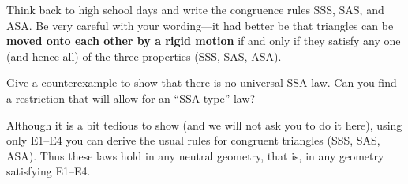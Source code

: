 \begin{exploration}
Think back to high school days and write the congruence rules SSS,
SAS, and ASA. Be very careful with your wording---it had better be
that triangles can be \textbf{moved onto each other by a rigid motion}
if and only if they satisfy any one (and hence all) of the three
properties (SSS, SAS, ASA).
\end{exploration}

\begin{question}
Give a counterexample to show that there is no universal SSA law.  Can
you find a restriction that will allow for an ``SSA-type'' law?
\end{question}

Although it is a bit tedious to show (and we will not ask you to do it
here), using only E1--E4 you can derive the usual rules for congruent
triangles (SSS, SAS, ASA). Thus these laws hold in any neutral
geometry, that is, in any geometry satisfying E1--E4.

